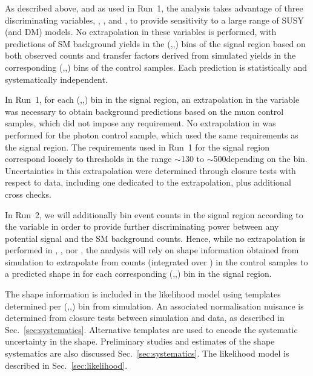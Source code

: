 As described above, and as used in Run~1, the analysis takes advantage
of three discriminating variables, \njet, \nb, and \HT, to provide
sensitivity to a large range of SUSY (and DM) models. No extrapolation
in these variables is performed, with predictions of SM background
yields in the (\njet,\nb,\HT) bins of the signal region based on both
observed counts and transfer factors derived from simulated yields in
the corresponding (\njet,\nb,\HT) bins of the control samples. Each
prediction is statistically and systematically independent.

In Run~1, for each (\njet,\nb,\HT) bin in the signal region, an
extrapolation in the variable \alphat was necessary to obtain
background predictions based on the muon control samples, which did
not impose any \alphat requirement. No extrapolation in \alphat was
performed for the photon control sample, which used the same \alphat
requirements as the signal region. The \alphat requirements used in
Run~1 for the signal region correspond loosely to \mht thresholds in
the range $\sim$130 to $\sim$500\gev depending on the \HT
bin. Uncertainties in this extrapolation were determined through
closure tests with respect to data, including one dedicated to the
\alphat extrapolation, plus additional cross checks.

In Run~2, we will additionally bin event counts in the signal region
according to the variable \mht in order to provide further
discriminating power between any potential signal and the SM
background counts. Hence, while no extrapolation is performed in
\njet, \nb, nor \HT, the analysis will rely on shape information
obtained from simulation to extrapolate from counts (integrated over
\mht) in the control samples to a predicted shape in \mht for each
corresponding (\njet,\nb,\HT) bin in the signal region. 

The \mht shape information is included in the likelihood model using
templates determined per (\njet,\nb,\HT) bin from simulation. An
associated normalisation nuisance is determined from closure tests
between simulation and data, as described in
Sec.~\ref{sec:systematics}. Alternative templates are used to encode
the systematic uncertainty in the \mht shape. Preliminary studies and
estimates of the shape systematics are also discussed
Sec.~\ref{sec:systematics}. The likelihood model is described in
Sec.~\ref{sec:likelihood}.

